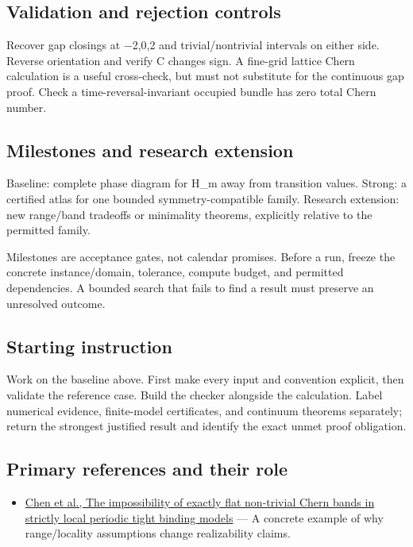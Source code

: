 \documentclass[
  11pt,
]{article}
\providecommand{\tightlist}{%
  \setlength{\itemsep}{0pt}\setlength{\parskip}{0pt}}
\begin{document}
\subsection{Validation and rejection controls}

Recover gap closings at \ensuremath{-}2,0,2 and trivial/nontrivial
intervals on either side. Reverse orientation and verify C changes sign.
A fine-grid lattice Chern calculation is a useful cross-check, but must
not substitute for the continuous gap proof. Check a
time-reversal-invariant occupied bundle has zero total Chern number.

\subsection{Milestones and research extension}

Baseline: complete phase diagram for H\_m away from transition values.
Strong: a certified atlas for one bounded symmetry-compatible family.
Research extension: new range/band tradeoffs or minimality theorems,
explicitly relative to the permitted family.

Milestones are acceptance gates, not calendar promises. Before a run,
freeze the concrete instance/domain, tolerance, compute budget, and
permitted dependencies. A bounded search that fails to find a result
must preserve an unresolved outcome.

\subsection{Starting instruction}

Work on the baseline above. First make every input and convention
explicit, then validate the reference case. Build the checker alongside
the calculation. Label numerical evidence, finite-model certificates,
and continuum theorems separately; return the strongest justified result
and identify the exact unmet proof obligation.

\subsection{Primary references and their role}

\begin{itemize}
\tightlist
\item
  \href{https://arxiv.org/abs/1311.4956}{Chen et al., The impossibility
  of exactly flat non-trivial Chern bands in strictly local periodic
  tight binding models} --- A concrete example of why range/locality
  assumptions change realizability claims.
\end{itemize}
\end{document}

